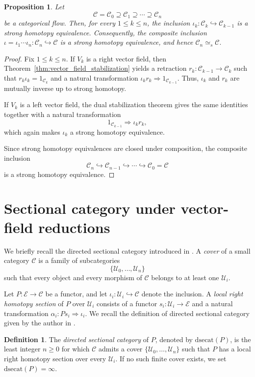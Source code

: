 \documentclass[12pt]{amsart}
\newtheorem{proposition}[teo]{Proposition}
\theoremstyle{definition}
\newtheorem{definition}[teo]{Definition}
\theoremstyle{remark}
\numberwithin{figure}{section}%
\newcommand{\CC}{\mathcal{C}}
\newcommand{\E}{\mathcal{E}}
\newcommand{\Uc}{\mathcal{U}}
\begin{document}
\begin{proposition}\label{prop:flows_preserve_strong_homotopy}
Let
\[
\CC=\CC_0
\supseteq
\CC_1
\supseteq
\cdots
\supseteq
\CC_n
\]
be a categorical flow. Then, for every \(1\leq k\leq n\), the inclusion
\(
\iota_k\colon\CC_k\hookrightarrow\CC_{k-1}
\)
is a strong homotopy equivalence. Consequently, the composite inclusion
\(
\iota
=
\iota_1\cdots\iota_n
\colon
\CC_n\hookrightarrow\CC
\)
is a strong homotopy equivalence, and hence
\(
\CC_n\simeq_s\CC.
\)
\end{proposition}

\begin{proof}
Fix \(1\leq k\leq n\). If \(V_k\) is a right vector field, then
Theorem~\ref{thm:vector_field_stabilization} yields a retraction
\(
r_k\colon\CC_{k-1}\longrightarrow\CC_k
\)
such that
\(
r_k\iota_k=1_{\CC_k}
\)
and a natural transformation
\(
\iota_kr_k\Rightarrow1_{\CC_{k-1}}.
\)
Thus, \(\iota_k\) and \(r_k\) are mutually inverse up to strong
homotopy.

If \(V_k\) is a left vector field, the dual stabilization theorem gives
the same identities together with a natural transformation
\[
1_{\CC_{k-1}}\Rightarrow\iota_kr_k,
\]
which again makes \(\iota_k\) a strong homotopy equivalence.

Since strong homotopy equivalences are closed under composition, the
composite inclusion
\[
\CC_n\hookrightarrow\CC_{n-1}
\hookrightarrow\cdots\hookrightarrow\CC_0=\CC
\]
is a strong homotopy equivalence.
\end{proof}


\section{Sectional category under vector-field reductions}
\label{sec:sectional_category_reductions}

We briefly recall the directed sectional category introduced in
\cite{DirectedHomotopyDatabases}. A \emph{cover} of a small category
\(\CC\) is a family of subcategories
\[
\{\Uc_0,\ldots,\Uc_n\}
\]
such that every object and every morphism of \(\CC\) belongs to at least
one \(\Uc_i\).

Let \(P\colon\E\to\CC\) be a functor, and let
\(\iota_i\colon\Uc_i\hookrightarrow\CC\) denote the inclusion. A
\emph{local right homotopy section} of \(P\) over \(\Uc_i\) consists of a
functor
\(
s_i\colon\Uc_i\longrightarrow\E
\)
and a natural transformation
\(
\alpha_i\colon Ps_i\Rightarrow\iota_i.
\)
We recall the definition of directed sectional category given by the author in \cite[Definition 6.2]{DirectedHomotopyDatabases}.
\begin{definition}
The \emph{directed sectional category} of \(P\), denoted by
\( \allowbreak\mathrm{dsecat}(P)\), is the least integer \(n\geq0\) for which
\(\CC\) admits a cover
\(
\{\Uc_0,\ldots,\Uc_n\}
\)
such that \(P\) has a local right homotopy section over every \(\Uc_i\).
If no such finite cover exists, we set
\(
\mathrm{dsecat}(P)=\infty.
\)
\end{definition}
\end{document}
